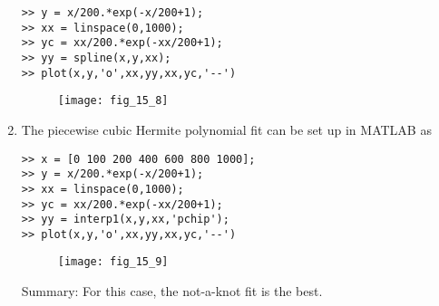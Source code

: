 \documentclass[../main.tex]{subfiles}
\begin{document}
\begin{enumerate}[label=\bfseries(\alph*)]
\begin{lstlisting}[numbers=none]
>> y = x/200.*exp(-x/200+1);
>> xx = linspace(0,1000);
>> yc = xx/200.*exp(-xx/200+1);
>> yy = spline(x,y,xx);
>> plot(x,y,'o',xx,yy,xx,yc,'--') 
\end{lstlisting}
	\bigbreak
	\begin{figure}[H]
		\texttt{[image: fig\_15\_8]}
		\label{fig:fig_15_8}
	\end{figure}
	\bigbreak
\item The piecewise cubic Hermite polynomial fit can be set up in MATLAB as
	\bigbreak
\begin{lstlisting}[numbers=none]
>> x = [0 100 200 400 600 800 1000];
>> y = x/200.*exp(-x/200+1);
>> xx = linspace(0,1000);
>> yc = xx/200.*exp(-xx/200+1);
>> yy = interp1(x,y,xx,'pchip');
>> plot(x,y,'o',xx,yy,xx,yc,'--') 
\end{lstlisting}
	\bigbreak
	\begin{figure}[H]
		\texttt{[image: fig\_15\_9]}
		\label{fig:fig_15_9}
	\end{figure}
	\bigbreak
Summary: For this case, the not-a-knot fit is the best.
	\bigbreak
\end{enumerate}
\end{document}
